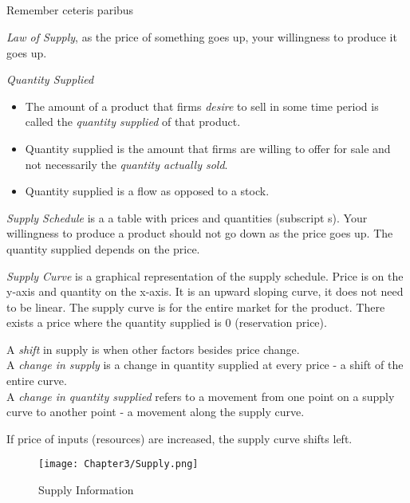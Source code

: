 \subsection{}

Remember ceteris paribus
\begin{definition}
    \emph{Law of Supply}, as the price of something goes up, your willingness to produce it goes up.
\end{definition}
\begin{definition}
    \emph{Quantity Supplied}
    \begin{itemize}
        \item The amount of a product that firms \emph{desire} to sell in some time period is called the \emph{quantity supplied}
        of that product.
        \item Quantity supplied is the amount that firms are willing to offer for sale and not necessarily the \emph{quantity actually sold}.
        \item Quantity supplied is a flow as opposed to a stock. 
    \end{itemize}
\end{definition}
\begin{definition}
    \emph{Supply Schedule} is a a table with prices and quantities (subscript s). Your willingness to produce
    a product should not go down as the price goes up. The quantity supplied depends on the price.
\end{definition}
\begin{definition}
    \emph{Supply Curve} is a graphical representation of the supply schedule. Price is on the y-axis and quantity on the x-axis.
    It is an upward sloping curve, it does not need to be linear. The supply curve is for the entire market for the product. 
    There exists a price where the quantity supplied is 0 (reservation price).
\end{definition}
\begin{definition}
    A \emph{shift} in supply is when other factors besides price change.\\
    A \emph{change in supply} is a change in quantity supplied at every price - a shift of the entire curve.\\
    A \emph{change in quantity supplied} refers to a movement from one point on a supply curve to another point - a
    movement along the supply curve.
\end{definition}
\begin{example}
    If price of inputs (resources) are increased, the supply curve shifts left.
\end{example}
\begin{figure}[h!]
    \centering
    \texttt{[image: Chapter3/Supply.png]}
    \caption{Supply Information}
\end{figure}